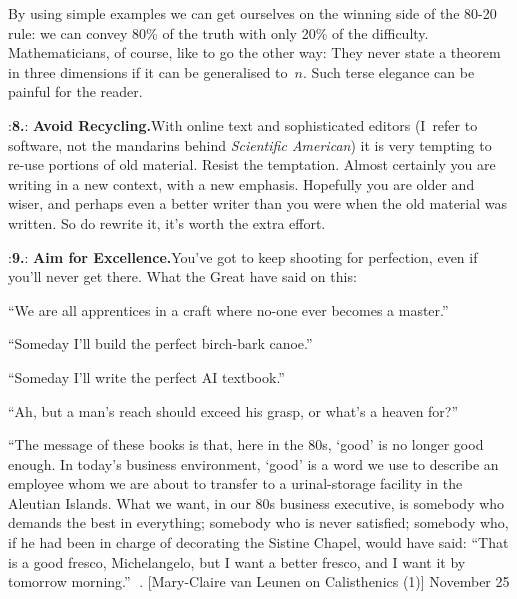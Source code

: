 By using simple examples we can get ourselves on the winning side of
the 80-20 rule: we can convey 80\% of the truth with only 20\% of the
difficulty. Mathematicians, of course, like to go the other way: They
never state a theorem in three dimensions if it can be generalised 
to~$n$. Such terse elegance can be painful for the reader.

\smallskip
\display 20pt:{\bf 8.}:
{\bf  Avoid Recycling.}\quad With online text and sophisticated
editors (I~refer to software, not the mandarins behind {\sl Scientific
American\/}) it is very tempting to re-use portions of old material.
Resist the temptation. Almost certainly you are writing in a new
context, with a new emphasis. Hopefully you are older and wiser, and
perhaps even a better writer than you were when the old material was
written. So do rewrite it, it's worth the extra effort.

\smallskip
\display 20pt:{\bf 9.}:
{\bf Aim for Excellence.}\quad You've got to keep shooting for perfection,
even if you'll never get there. What the Great have said on this:

{\narrower\smallskip\noindent
 ``We are all apprentices in a craft where no-one ever becomes a master.''
\smallskip}

{\narrower\smallskip\noindent
 ``Someday I'll build the perfect birch-bark canoe.''
\smallskip}

{\narrower\smallskip\noindent
 ``Someday I'll write the perfect AI textbook.''
\smallskip}

{\narrower\smallskip\noindent
 ``Ah, but a man's reach should exceed his grasp, or what's a heaven for?''  
\smallskip}

{\narrower\smallskip\noindent
``The message of these books is that, here in the 80s, `good' is no
  longer good enough. In today's business environment, `good' is a word
  we use to describe an employee whom we are about to transfer to a
  urinal-storage facility in the Aleutian Islands. What we want, in our
  80s business executive, is somebody who demands the best in
  everything; somebody who is never satisfied; somebody who, if he had
  been in charge of decorating the Sistine Chapel, would have said:
       ``That is a good fresco, Michelangelo, but I want a
        better fresco, and I want it by tomorrow morning.''
\smallskip}
. [Mary-Claire van Leunen on Calisthenics (1)] \tll November 25

